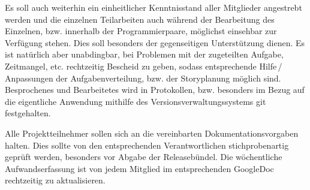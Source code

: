 Es soll auch weiterhin ein einheitlicher Kenntnisstand aller Mitglieder angestrebt werden und die einzelnen Teilarbeiten auch während der Bearbeitung des Einzelnen, bzw. innerhalb der Programmierpaare, möglichst einsehbar zur Verfügung stehen. Dies soll besonders der gegenseitigen Unterstützung dienen. Es ist natürlich aber unabdingbar, bei Problemen mit der zugeteilten Aufgabe, Zeitmangel, etc. rechtzeitig Bescheid zu geben, sodass entsprechende Hilfe\,/\,Anpassungen der Aufgabenverteilung, bzw. der Storyplanung möglich sind.
Besprochenes und Bearbeitetes wird in Protokollen, bzw. besonders im Bezug auf die eigentliche Anwendung mithilfe des Versionsverwaltungssystems git festgehalten.

Alle Projektteilnehmer sollen sich an die vereinbarten Dokumentationsvorgaben halten. Dies sollte von den entsprechenden Verantwortlichen stichprobenartig geprüft werden, besonders vor Abgabe der Releasebündel. Die wöchentliche Aufwandserfassung ist von jedem Mitglied im entsprechenden GoogleDoc rechtzeitig zu aktualisieren.

